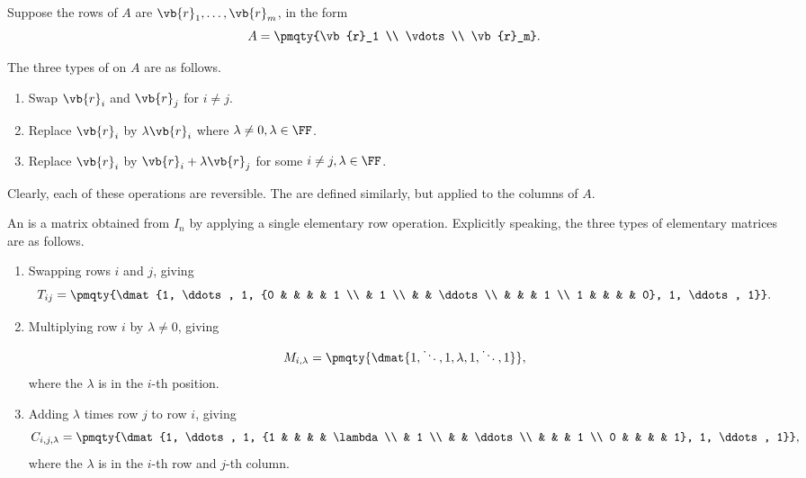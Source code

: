 Suppose the rows of \(A\) are \(\vb{r}_1, \ldots, \vb{r}_m\), in the form
\[
    A = \pmqty{\vb{r}_1 \\ \vdots \\ \vb{r}_m}.
\]

\begin{definition}
    The three types of  on \(A\) are as follows.
    \begin{enumerate}
        \item Swap \(\vb{r}_i\) and \(\vb{r}_j\) for \(i \neq j\).
        \item Replace \(\vb{r}_i\) by \(\lambda \vb{r}_i\) where \(\lambda \neq 0, \lambda \in \FF\).
        \item Replace \(\vb{r}_i\) by \(\vb{r}_i + \lambda \vb{r}_j\) for some \(i \neq j, \lambda \in \FF\).
    \end{enumerate}
\end{definition}

Clearly, each of these operations are reversible. The  are defined similarly, but applied to the columns of \(A\).

\begin{definition}
    An  is a matrix obtained from \(I_n\) by applying a single elementary row operation. Explicitly speaking, the three types of elementary matrices are as follows.
    \begin{enumerate}
        \item Swapping rows \(i\) and \(j\), giving
        \[
            T_{ij} = \pmqty{\dmat{1, \ddots, 1, {0 & & & & 1 \\ & 1 \\ & & \ddots  \\ & & & 1 \\ 1 & & & & 0}, 1, \ddots, 1}}.
        \]
        \item Multiplying row \(i\) by \(\lambda \neq 0\), giving
        \[
            M_{i, \lambda} = \pmqty{\dmat{1, \ddots, 1, \lambda, 1, \ddots, 1}},
        \]
        where the \(\lambda\) is in the \(i\)-th position.
        \item Adding \(\lambda\) times row \(j\) to row \(i\), giving
        \[
            C_{i, j, \lambda} = \pmqty{\dmat{1, \ddots, 1, {1 & & & & \lambda \\ & 1 \\ & & \ddots  \\ & & & 1 \\ 0 & & & & 1}, 1, \ddots, 1}},
        \]
        where the \(\lambda\) is in the \(i\)-th row and \(j\)-th column.
    \end{enumerate}
\end{definition}

